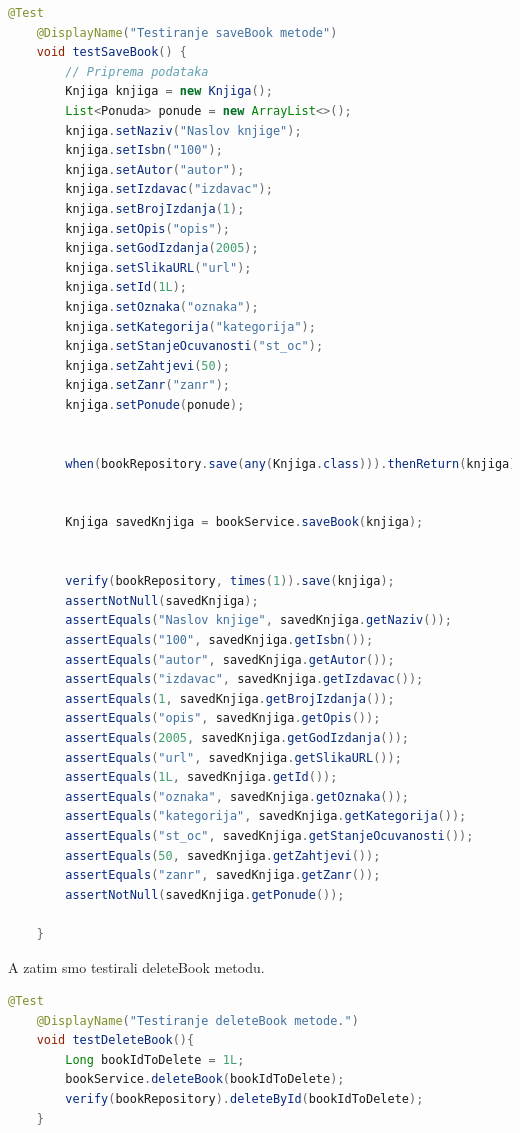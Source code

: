            \begin{lstlisting}[language=Java, label=lst:java_example, basicstyle=\scriptsize, baselinestretch=0.9]
 @Test
    @DisplayName("Testiranje saveBook metode")
    void testSaveBook() {
        // Priprema podataka
        Knjiga knjiga = new Knjiga();
        List<Ponuda> ponude = new ArrayList<>();
        knjiga.setNaziv("Naslov knjige");
        knjiga.setIsbn("100");
        knjiga.setAutor("autor");
        knjiga.setIzdavac("izdavac");
        knjiga.setBrojIzdanja(1);
        knjiga.setOpis("opis");
        knjiga.setGodIzdanja(2005);
        knjiga.setSlikaURL("url");
        knjiga.setId(1L);
        knjiga.setOznaka("oznaka");
        knjiga.setKategorija("kategorija");
        knjiga.setStanjeOcuvanosti("st_oc");
        knjiga.setZahtjevi(50);
        knjiga.setZanr("zanr");
        knjiga.setPonude(ponude);


        when(bookRepository.save(any(Knjiga.class))).thenReturn(knjiga);


        Knjiga savedKnjiga = bookService.saveBook(knjiga);


        verify(bookRepository, times(1)).save(knjiga);
        assertNotNull(savedKnjiga);
        assertEquals("Naslov knjige", savedKnjiga.getNaziv());
        assertEquals("100", savedKnjiga.getIsbn());
        assertEquals("autor", savedKnjiga.getAutor());
        assertEquals("izdavac", savedKnjiga.getIzdavac());
        assertEquals(1, savedKnjiga.getBrojIzdanja());
        assertEquals("opis", savedKnjiga.getOpis());
        assertEquals(2005, savedKnjiga.getGodIzdanja());
        assertEquals("url", savedKnjiga.getSlikaURL());
        assertEquals(1L, savedKnjiga.getId());
        assertEquals("oznaka", savedKnjiga.getOznaka());
        assertEquals("kategorija", savedKnjiga.getKategorija());
        assertEquals("st_oc", savedKnjiga.getStanjeOcuvanosti());
        assertEquals(50, savedKnjiga.getZahtjevi());
        assertEquals("zanr", savedKnjiga.getZanr());
        assertNotNull(savedKnjiga.getPonude());

    }
\end{lstlisting}

   
			A zatim smo testirali deleteBook metodu. 
                  \begin{lstlisting}[language=Java, label=2st:java_example, basicstyle=\scriptsize, baselinestretch=0.9]
 @Test
    @DisplayName("Testiranje deleteBook metode.")
    void testDeleteBook(){
        Long bookIdToDelete = 1L;
        bookService.deleteBook(bookIdToDelete);
        verify(bookRepository).deleteById(bookIdToDelete);
    }
    
\end{lstlisting}

